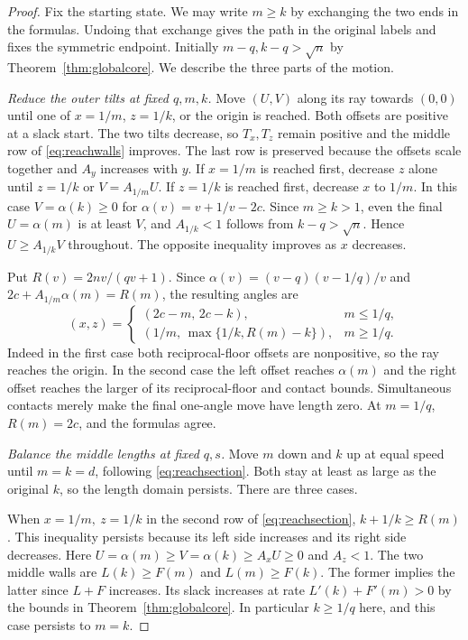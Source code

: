\begin{proof}
Fix the starting state. We may write $m\ge k$ by exchanging the two ends in the formulas. Undoing that exchange gives the path in the original labels and fixes the symmetric endpoint. Initially $m-q,k-q>\sqrt n$ by Theorem~\ref{thm:globalcore}. We describe the three parts of the motion.

\emph{Reduce the outer tilts at fixed $q,m,k$.}
Move $(U,V)$ along its ray towards $(0,0)$ until one of $x=1/m$, $z=1/k$, or the origin is reached. Both offsets are positive at a slack start. The two tilts decrease, so $T_x,T_z$ remain positive and the middle row of \eqref{eq:reachwalls} improves. The last row is preserved because the offsets scale together and $A_y$ increases with $y$. If $x=1/m$ is reached first, decrease $z$ alone until $z=1/k$ or $V=A_{1/m}U$. If $z=1/k$ is reached first, decrease $x$ to $1/m$. In this case $V=\alpha(k)\ge0$ for $\alpha(v)=v+1/v-2c$. Since $m\ge k>1$, even the final $U=\alpha(m)$ is at least $V$, and $A_{1/k}<1$ follows from $k-q>\sqrt n$. Hence $U\ge A_{1/k}V$ throughout. The opposite inequality improves as $x$ decreases.

Put $R(v)=2nv/(qv+1)$. Since $\alpha(v)=(v-q)(v-1/q)/v$ and $2c+A_{1/m}\alpha(m)=R(m)$, the resulting angles are
\begin{equation}\label{eq:reachsection}
 (x,z)=
 \begin{cases}
 (2c-m,\,2c-k),&m\le1/q,\\
 (1/m,\,\max\{1/k,R(m)-k\}),&m\ge1/q .
 \end{cases}
\end{equation}
Indeed in the first case both reciprocal-floor offsets are nonpositive, so the ray reaches the origin. In the second case the left offset reaches $\alpha(m)$ and the right offset reaches the larger of its reciprocal-floor and contact bounds. Simultaneous contacts merely make the final one-angle move have length zero. At $m=1/q$, $R(m)=2c$, and the formulas agree.

\emph{Balance the middle lengths at fixed $q,s$.}
Move $m$ down and $k$ up at equal speed until $m=k=d$, following \eqref{eq:reachsection}. Both stay at least as large as the original $k$, so the length domain persists. There are three cases.

When $x=1/m,\ z=1/k$ in the second row of \eqref{eq:reachsection}, $k+1/k\ge R(m)$. This inequality persists because its left side increases and its right side decreases. Here $U=\alpha(m)\ge V=\alpha(k)\ge A_xU\ge0$ and $A_z<1$. The two middle walls are $L(k)\ge F(m)$ and $L(m)\ge F(k)$. The former implies the latter since $L+F$ increases. Its slack increases at rate $L'(k)+F'(m)>0$ by the bounds in Theorem~\ref{thm:globalcore}. In particular $k\ge1/q$ here, and this case persists to $m=k$.


\end{proof}

